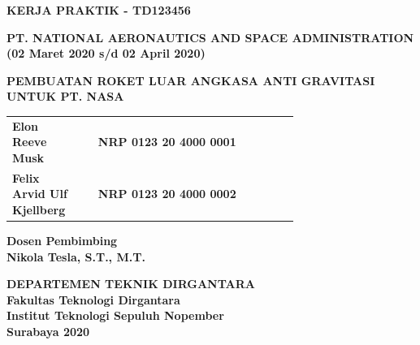 \begin{flushleft}

  \sffamily

  \noindent
  \textbf{KERJA PRAKTIK - TD123456}
  \vspace{4ex}

  \noindent
  {\large \textbf{PT. NATIONAL AERONAUTICS AND SPACE ADMINISTRATION}} \\
  \textbf{(02 Maret 2020 s/d 02 April 2020)}
  \vspace{6ex}

  \noindent
  {\large \textbf{PEMBUATAN ROKET LUAR ANGKASA ANTI GRAVITASI UNTUK PT. NASA}}
  \vspace{6ex}

  \begin{adjustwidth}{-0.2cm}{}
    \begin{tabular}{lcp{0.7\linewidth}}
      \textbf{Elon Reeve Musk} & & \textbf{NRP 0123 20 4000 0001} \\
      \textbf{Felix Arvid Ulf Kjellberg} & & \textbf{NRP 0123 20 4000 0002} \\
    \end{tabular}
  \end{adjustwidth}
  \vspace{4ex}

  \noindent
  \textbf{Dosen Pembimbing} \\
  \textbf{Nikola Tesla, S.T., M.T.}
  \vspace{12ex}

  \noindent
  \textbf{DEPARTEMEN TEKNIK DIRGANTARA} \\
  \textbf{Fakultas Teknologi Dirgantara} \\
  \textbf{Institut Teknologi Sepuluh Nopember} \\
  \textbf{Surabaya 2020}

\end{flushleft}

\restoregeometry
